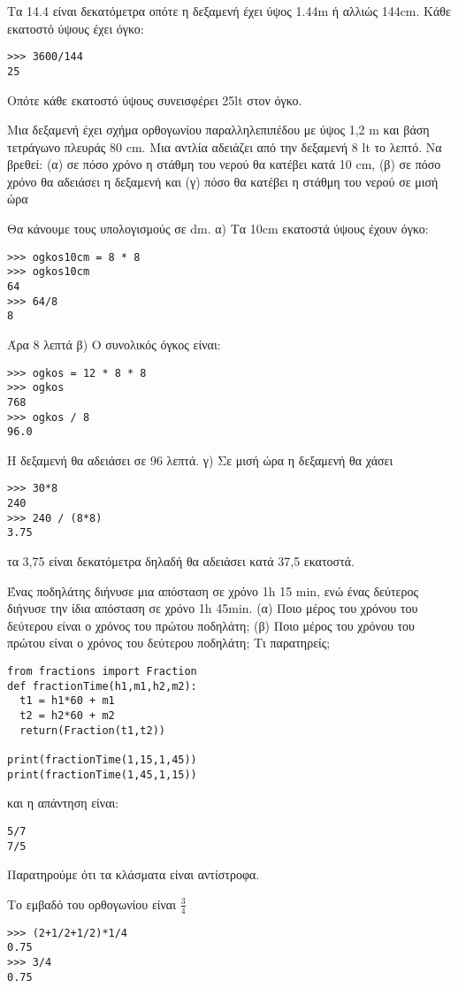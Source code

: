 Τα 14.4 είναι δεκατόμετρα οπότε η δεξαμενή έχει ύψος 1.44m ή αλλιώς 144cm. Κάθε εκατοστό ύψους έχει όγκο:
\begin{lstlisting}
>>> 3600/144
25
\end{lstlisting}
Οπότε κάθε εκατοστό ύψους συνεισφέρει 25lt στον όγκο.
\begin{exercise}
Μια δεξαμενή έχει σχήμα ορθογωνίου παραλληλεπιπέδου με ύψος 1,2 m και βάση τετράγωνο πλευράς 80 cm. Μια αντλία αδειάζει από την δεξαμενή 8 lt το λεπτό. Να βρεθεί: (α) σε πόσο χρόνο η στάθμη του νερού θα κατέβει κατά 10 cm, (β) σε πόσο χρόνο θα αδειάσει η δεξαμενή και (γ) πόσο θα κατέβει η στάθμη του νερού σε μισή ώρα
\end{exercise}
Θα κάνουμε τους υπολογισμούς σε dm. 
α) Τα 10cm εκατοστά ύψους έχουν όγκο:
\begin{lstlisting}
>>> ogkos10cm = 8 * 8
>>> ogkos10cm
64
>>> 64/8
8
\end{lstlisting}
Άρα 8 λεπτά
β)
Ο συνολικός όγκος είναι:
\begin{lstlisting}
>>> ogkos = 12 * 8 * 8
>>> ogkos
768
>>> ogkos / 8
96.0
\end{lstlisting}
Η δεξαμενή θα αδειάσει σε 96 λεπτά.
γ) Σε μισή ώρα η δεξαμενή θα χάσει
\begin{lstlisting}
>>> 30*8
240
>>> 240 / (8*8)
3.75
\end{lstlisting}
τα 3,75 είναι δεκατόμετρα δηλαδή θα αδειάσει κατά 37,5 εκατοστά.
\begin{exercise}
Ένας ποδηλάτης διήνυσε μια απόσταση σε χρόνο 1h 15 min, ενώ ένας δεύτερος διήνυσε την ίδια απόσταση σε χρόνο 1h 45min. (α) Ποιο μέρος του χρόνου του δεύτερου είναι ο χρόνος του πρώτου ποδηλάτη; (β) Ποιο μέρος του χρόνου του πρώτου είναι ο χρόνος του δεύτερου ποδηλάτη; Τι παρατηρείς; 
\end{exercise}
\begin{lstlisting}
from fractions import Fraction
def fractionTime(h1,m1,h2,m2):
  t1 = h1*60 + m1
  t2 = h2*60 + m2
  return(Fraction(t1,t2))

print(fractionTime(1,15,1,45))
print(fractionTime(1,45,1,15))
\end{lstlisting}
και η απάντηση είναι:
\begin{lstlisting}
5/7
7/5
\end{lstlisting}
Παρατηρούμε ότι τα κλάσματα είναι αντίστροφα.
\begin{exercise}
Το εμβαδό του ορθογωνίου είναι $\frac{3}{4}$
\end{exercise}
\begin{lstlisting}
>>> (2+1/2+1/2)*1/4
0.75
>>> 3/4
0.75
\end{lstlisting}
